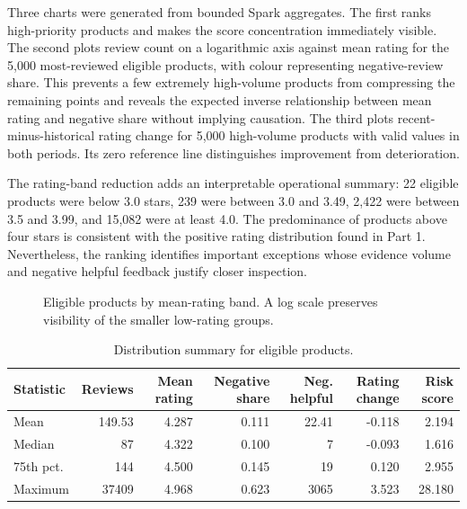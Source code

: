 \documentclass[10pt,a4paper]{article}
\begin{document}
Three charts were generated from bounded Spark aggregates. The first ranks high-priority products and makes the score concentration immediately visible. The second plots review count on a logarithmic axis against mean rating for the 5,000 most-reviewed eligible products, with colour representing negative-review share. This prevents a few extremely high-volume products from compressing the remaining points and reveals the expected inverse relationship between mean rating and negative share without implying causation. The third plots recent-minus-historical rating change for 5,000 high-volume products with valid values in both periods. Its zero reference line distinguishes improvement from deterioration.

The rating-band reduction adds an interpretable operational summary: 22 eligible products were below 3.0 stars, 239 were between 3.0 and 3.49, 2,422 were between 3.5 and 3.99, and 15,082 were at least 4.0. The predominance of products above four stars is consistent with the positive rating distribution found in Part 1. Nevertheless, the ranking identifies important exceptions whose evidence volume and negative helpful feedback justify closer inspection.

\begin{figure}[H]
\centering
{}
\caption{Eligible products by mean-rating band. A log scale preserves visibility of the smaller low-rating groups.}
\end{figure}

\begin{table}[H]
\centering\small
\caption{Distribution summary for eligible products.}
\begin{tabular}{@{}lrrrrrr@{}}\toprule
Statistic & Reviews & Mean rating & Negative share & Neg. helpful & Rating change & Risk score \\\midrule
Mean & 149.53 & 4.287 & 0.111 & 22.41 & -0.118 & 2.194 \\
Median & 87 & 4.322 & 0.100 & 7 & -0.093 & 1.616 \\
75th pct. & 144 & 4.500 & 0.145 & 19 & 0.120 & 2.955 \\
Maximum & 37409 & 4.968 & 0.623 & 3065 & 3.523 & 28.180 \\\bottomrule
\end{tabular}
\end{table}
\end{document}
